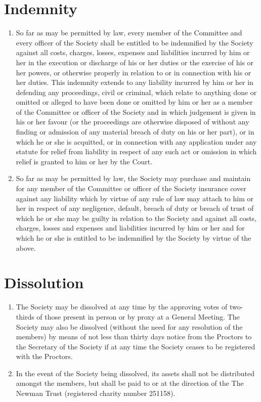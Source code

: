 \documentclass[11pt]{article}
\begin{document}
\section{Indemnity}
\begin{enumerate}
\item So far as may be permitted by law, every member of the Committee and every officer of the Society shall be entitled to be indemnified by the Society against all costs, charges, losses, expenses and liabilities incurred by him or her in the execution or discharge of his or her duties or the exercise of his or her powers, or otherwise properly in relation to or in connection with his or her duties. This indemnity extends to any liability incurred by him or her in defending any proceedings, civil or criminal, which relate to anything done or omitted or alleged to have been done or omitted by him or her as a member of the Committee or officer of the Society and in which judgement is given in his or her favour (or the proceedings are otherwise disposed of without any finding or admission of any material breach of duty on his or her part), or in which he or she is acquitted, or in connection with any application under any statute for relief from liability in respect of any such act or omission in which relief is granted to him or her by the Court.
\item So far as may be permitted by law, the Society may purchase and maintain for any member of the Committee or officer of the Society insurance cover against any liability which by virtue of any rule of law may attach to him or her in respect of any negligence, default, breach of duty or breach of trust of which he or she may be guilty in relation to the Society and against all costs, charges, losses and expenses and liabilities incurred by him or her and for which he or she is entitled to be indemnified by the Society by virtue of the above.
\end{enumerate}
\section{Dissolution}
\begin{enumerate}
\item The Society may be dissolved at any time by the approving votes of two-thirds of those present in person or by proxy at a General Meeting. The Society may also be dissolved (without the need for any resolution of the members) by means of not less than thirty days notice from the Proctors to the Secretary of the Society if at any time the Society ceases to be registered with the Proctors.
\item In the event of the Society being dissolved, its assets shall not be distributed amongst the members, but shall be paid to or at the direction of the The Newman Trust (registered charity number 251158).
\end{enumerate}
\end{document}
